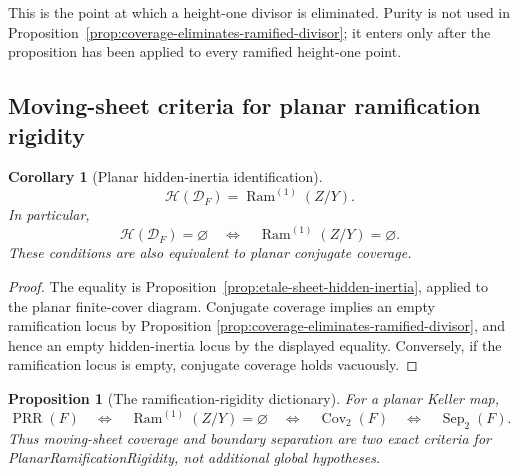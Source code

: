 \documentclass[11pt]{article}
\newtheorem{proposition}[theorem]{Proposition}
\newtheorem{corollary}[theorem]{Corollary}
\theoremstyle{remark}
\theoremstyle{definition}
\DeclareMathOperator{\Ram}{Ram}
\begin{document}
This is the point at which a height-one divisor is eliminated.  Purity is
not used in Proposition~\ref{prop:coverage-eliminates-ramified-divisor};
it enters only after the proposition has been applied to every ramified
height-one point.

\subsection{Moving-sheet criteria for planar ramification rigidity}
\label{sec:planar-no-hidden-inertia}

\begin{corollary}[Planar hidden-inertia identification]
\label{cor:planar-codimension-one-unramified}
\[
  \mathcal H(\mathcal D_F)=\Ram^{(1)}(Z/Y).
\]
In particular,
\[
  \mathcal H(\mathcal D_F)=\varnothing
  \quad\Longleftrightarrow\quad
  \Ram^{(1)}(Z/Y)=\varnothing.
\]
These conditions are also equivalent to planar conjugate coverage.
\end{corollary}

\begin{proof}
The equality is Proposition~\ref{prop:etale-sheet-hidden-inertia}, applied
to the planar finite-cover diagram.  Conjugate coverage
implies an empty ramification locus by Proposition
\ref{prop:coverage-eliminates-ramified-divisor}, and hence an empty
hidden-inertia locus by the displayed equality.  Conversely, if the
ramification locus is empty, conjugate coverage holds vacuously.
\end{proof}

\begin{proposition}[The ramification-rigidity dictionary]
\label{prop:planar-ramification-rigidity-dictionary}
For a planar Keller map,
\[
  \operatorname{PRR}(F)
  \quad\Longleftrightarrow\quad
  \Ram^{(1)}(Z/Y)=\varnothing
  \quad\Longleftrightarrow\quad
  \operatorname{Cov}_2(F)
  \quad\Longleftrightarrow\quad
  \operatorname{Sep}_2(F).
\]
Thus moving-sheet coverage and boundary separation are two exact criteria
for PlanarRamificationRigidity, not additional global hypotheses.
\end{proposition}
\end{document}
